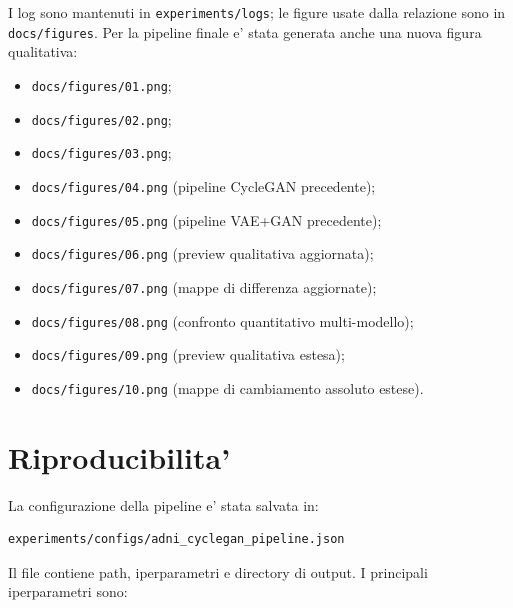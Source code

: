 \documentclass[12pt,a4paper]{article}
\begin{document}
I log sono mantenuti in \texttt{experiments/logs}; le figure usate dalla relazione sono in \texttt{docs/figures}. Per la pipeline finale e' stata generata anche una nuova figura qualitativa:

\begin{itemize}[leftmargin=1.2cm]
    \item \texttt{docs/figures/01.png};
    \item \texttt{docs/figures/02.png};
    \item \texttt{docs/figures/03.png};
    \item \texttt{docs/figures/04.png} (pipeline CycleGAN precedente);
    \item \texttt{docs/figures/05.png} (pipeline VAE+GAN precedente);
    \item \texttt{docs/figures/06.png} (preview qualitativa aggiornata);
    \item \texttt{docs/figures/07.png} (mappe di differenza aggiornate);
    \item \texttt{docs/figures/08.png} (confronto quantitativo multi-modello);
    \item \texttt{docs/figures/09.png} (preview qualitativa estesa);
    \item \texttt{docs/figures/10.png} (mappe di cambiamento assoluto estese).
\end{itemize}

\section{Riproducibilita'}

La configurazione della pipeline e' stata salvata in:

\begin{lstlisting}
experiments/configs/adni_cyclegan_pipeline.json
\end{lstlisting}

Il file contiene path, iperparametri e directory di output. I principali iperparametri sono:
\end{document}
